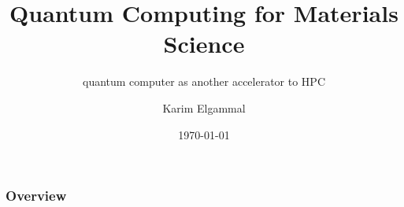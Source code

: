\documentclass{beamer}
\title[Quantum Computing for Materials]{Quantum Computing for Materials Science}
\subtitle{quantum computer as another accelerator to HPC}
\author[Karim Elgammal]{Karim Elgammal}
\institute[QAS2024]{QAS2024}
\date{\today}
\begin{document}
\frame{\titlepage}

\begin{frame}
\frametitle{Overview}
\tableofcontents
\end{frame}





\end{document}
